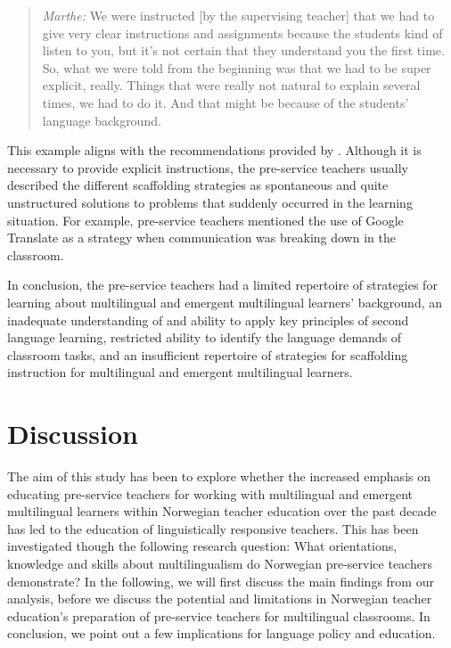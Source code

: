 \documentclass[output=paper]{langscibook}
\begin{document}
\begin{quote}
\emph{Marthe:} We were instructed [by the supervising teacher] that we had to give very clear instructions and assignments because the students kind of listen to you, but it’s not certain that they understand you the first time. So, what we were told from the beginning was that we had to be super explicit, really. Things that were really not natural to explain several times, we had to do it. And that might be because of the students’ language background. 
\end{quote}

This example aligns with the recommendations provided by \citet{LucasVillegas2013}. Although it is necessary to provide explicit instructions, the pre-service teachers usually described the different scaffolding strategies as spontaneous and quite unstructured solutions to problems that suddenly occurred in the learning situation. For example, pre-service teachers mentioned the use of Google Translate as a strategy when communication was breaking down in the classroom. 

In conclusion, the pre-service teachers had a limited repertoire of strategies for learning about multilingual and emergent multilingual learners’ background, an inadequate understanding of and ability to apply key principles of second language learning, restricted ability to identify the language demands of classroom tasks, and an insufficient repertoire of strategies for scaffolding instruction for multilingual and emergent multilingual learners.

\section{Discussion}

The aim of this study has been to explore whether the increased emphasis on educating pre-service teachers for working with multilingual and emergent multilingual learners within Norwegian teacher education over the past decade has led to the education of linguistically responsive teachers. This has been investigated though the following research question: What orientations, knowledge and skills about multilingualism do Norwegian pre-service teachers demonstrate? In the following, we will first discuss the main findings from our analysis, before we discuss the potential and limitations in Norwegian teacher education’s preparation of pre-service teachers for multilingual classrooms. In conclusion, we point out a few implications for language policy and education. 
\end{document}
